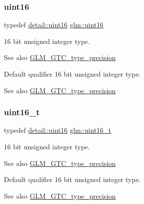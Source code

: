 \subsubsection{\texorpdfstring{uint16}{uint16}}
{\footnotesize\ttfamily typedef \mbox{\hyperlink{namespaceglm_1_1detail_a47b2a7d006d187338e8031a352d1ce56}{detail\+::uint16}} \mbox{\hyperlink{group__gtc__type__precision_gad8c2939e1fdd8e5828b31d95c52255d5}{glm\+::uint16}}}

16 bit unsigned integer type. \begin{DoxySeeAlso}{See also}
\mbox{\hyperlink{group__gtc__type__precision}{G\+L\+M\+\_\+\+G\+T\+C\+\_\+type\+\_\+precision}}
\end{DoxySeeAlso}
Default qualifier 16 bit unsigned integer type. \begin{DoxySeeAlso}{See also}
\mbox{\hyperlink{group__gtc__type__precision}{G\+L\+M\+\_\+\+G\+T\+C\+\_\+type\+\_\+precision}} 
\end{DoxySeeAlso}
\mbox{\label{group__gtc__type__precision_gac4eb4f43cae8129b00086dc234d3b8fc}} 
\subsubsection{\texorpdfstring{uint16\+\_\+t}{uint16\_t}}
{\footnotesize\ttfamily typedef \mbox{\hyperlink{namespaceglm_1_1detail_a47b2a7d006d187338e8031a352d1ce56}{detail\+::uint16}} \mbox{\hyperlink{group__gtc__type__precision_gac4eb4f43cae8129b00086dc234d3b8fc}{glm\+::uint16\+\_\+t}}}

16 bit unsigned integer type. \begin{DoxySeeAlso}{See also}
\mbox{\hyperlink{group__gtc__type__precision}{G\+L\+M\+\_\+\+G\+T\+C\+\_\+type\+\_\+precision}}
\end{DoxySeeAlso}
Default qualifier 16 bit unsigned integer type. \begin{DoxySeeAlso}{See also}
\mbox{\hyperlink{group__gtc__type__precision}{G\+L\+M\+\_\+\+G\+T\+C\+\_\+type\+\_\+precision}} 
\end{DoxySeeAlso}
\mbox{\label{group__gtc__type__precision_ga202b6a53c105fcb7e531f9b443518451}} 
